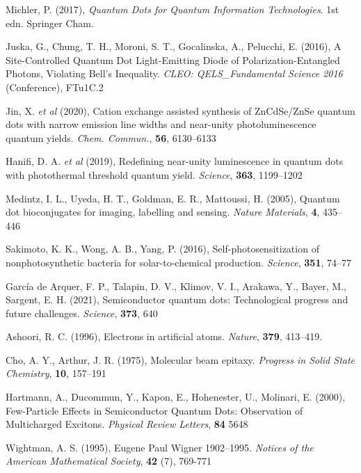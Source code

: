 \documentclass[12pt]{article}
\begin{document}
\begin{thebibliography}{10}

Michler, P. (2017), \textit{Quantum Dots for Quantum Information Technologies}. 1st edn. Springer Cham.

Juska, G., Chung, T. H., Moroni, S. T., Gocalinska, A., Pelucchi, E. (2016), A Site-Controlled Quantum Dot Light-Emitting Diode of Polarization-Entangled Photons, Violating Bell's Inequality. \textit{CLEO: QELS\_Fundamental Science 2016} (Conference), FTu1C.2

Jin, X. \textit{et al} (2020), Cation exchange assisted synthesis of ZnCdSe/ZnSe quantum dots with narrow emission line widths and near-unity photoluminescence quantum yields. \textit{Chem. Commun.}, \textbf{56}, 6130--6133

Hanifi, D. A. \textit{et al} (2019), Redefining near-unity luminescence in quantum dots with photothermal threshold quantum yield. \textit{Science}, \textbf{363}, 1199--1202

Medintz, I. L., Uyeda, H. T., Goldman, E. R., Mattoussi, H. (2005),
Quantum dot bioconjugates for imaging, labelling and sensing. \textit{Nature Materials}, \textbf{4}, 435--446

Sakimoto, K. K., Wong, A. B., Yang, P. (2016), Self-photosensitization
of nonphotosynthetic bacteria for solar-to-chemical production. \textit{Science}, \textbf{351}, 74--77

García de Arquer, F. P., Talapin, D. V., Klimov, V. I., Arakawa, Y., Bayer, M., Sargent, E. H. (2021), Semiconductor quantum dots: Technological progress and future challenges. \textit{Science}, \textbf{373}, 640 

Ashoori, R. C. (1996), Electrons in artificial atoms. \textit{Nature}, \textbf{379}, 413--419.

Cho, A. Y., Arthur, J. R. (1975), Molecular beam epitaxy. \textit{Progress in Solid State Chemistry}, \textbf{10}, 157--191

Hartmann, A., Ducommun, Y., Kapon, E., Hohenester, U., Molinari, E. (2000), Few-Particle Effects in Semiconductor Quantum Dots: Observation of Multicharged Excitons. \textit{Physical Review Letters}, \textbf{84} 5648

Wightman, A. S. (1995), Eugene Paul Wigner 1902--1995. \textit{Notices of the American Mathematical Society}, \textbf{42} (7), 769-771


\end{thebibliography}
\end{document}

